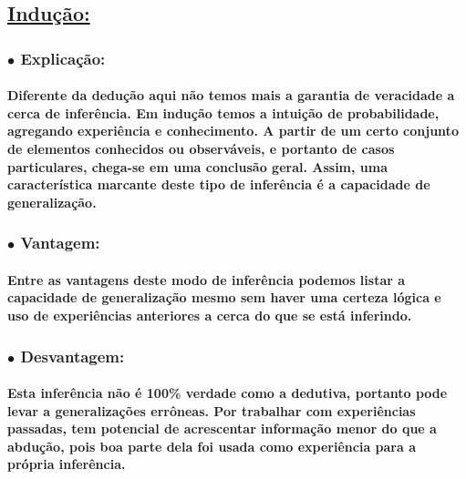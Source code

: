 \documentclass[a4paper]{article}    %
\begin{document}
\subsection*{\underline{Indução:}}

\subsubsection*{\hspace{5mm}$\bullet$ Explicação:}
\paragraph{Diferente da dedução aqui não temos mais a garantia de veracidade a cerca de inferência. Em indução temos a intuição de probabilidade, agregando experiência e conhecimento. A partir de um certo conjunto de elementos conhecidos ou observáveis, e portanto de casos particulares, chega-se em uma conclusão geral. Assim, uma característica marcante deste tipo de inferência é a capacidade de generalização.}

\subsubsection*{\hspace{5mm}$\bullet$ Vantagem:}
\paragraph{Entre as vantagens deste modo de inferência podemos listar a capacidade de generalização mesmo sem haver uma certeza lógica e uso de experiências anteriores a cerca do que se está inferindo.}

\subsubsection*{\hspace{5mm}$\bullet$ Desvantagem:}
\paragraph{Esta inferência não é 100\% verdade como a dedutiva, portanto pode levar a generalizações errôneas. Por trabalhar com experiências passadas, tem potencial de acrescentar informação menor do que a abdução, pois boa parte dela foi usada como experiência para a própria inferência.}
\end{document}
